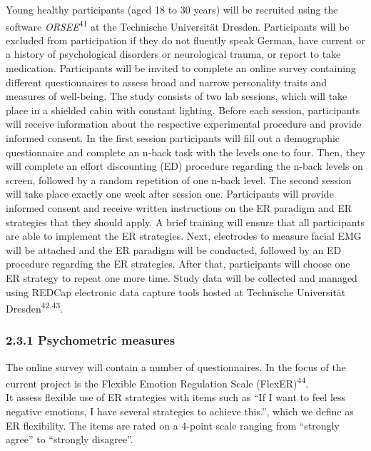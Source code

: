 \documentclass[
  english,
  man,floatsintext]{apa6}
\begin{document}
Young healthy participants (aged 18 to 30 years) will be recruited using the software \emph{ORSEE}\textsuperscript{41} at the Technische Universität Dresden.
Participants will be excluded from participation if they do not fluently speak German, have current or a history of psychological disorders or neurological trauma, or report to take medication.
Participants will be invited to complete an online survey containing different questionnaires to assess broad and narrow personality traits and measures of well-being.
The study consists of two lab sessions, which will take place in a shielded cabin with constant lighting.
Before each session, participants will receive information about the respective experimental procedure and provide informed consent.
In the first session participants will fill out a demographic questionnaire and complete an n-back task with the levels one to four.
Then, they will complete an effort discounting (ED) procedure regarding the n-back levels on screen, followed by a random repetition of one n-back level.
The second session will take place exactly one week after session one.
Participants will provide informed consent and receive written instructions on the ER paradigm and ER strategies that they should apply.
A brief training will ensure that all participants are able to implement the ER strategies.
Next, electrodes to measure facial EMG will be attached and the ER paradigm will be conducted, followed by an ED procedure regarding the ER strategies.
After that, participants will choose one ER strategy to repeat one more time.
Study data will be collected and managed using REDCap electronic data capture tools hosted at Technische Universität Dresden\textsuperscript{42,43}.

\hypertarget{psychometric-measures}{%
\subsubsection{2.3.1 Psychometric measures}\label{psychometric-measures}}

The online survey will contain a number of questionnaires.
In the focus of the current project is the Flexible Emotion Regulation Scale (FlexER)\textsuperscript{44}.\\
It assess flexible use of ER strategies with items such as ``If I want to feel less negative emotions, I have several strategies to achieve this.'', which we define as ER flexibility.
The items are rated on a 4-point scale ranging from ``strongly agree'' to ``strongly disagree''.
\end{document}
